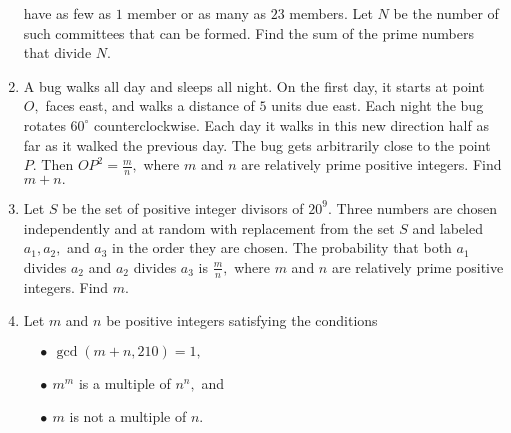 \documentclass{article}
\begin{document}
\begin{enumerate}[label=\arabic*., itemsep=0.5em]
have as few as \(1\) member or as many as \(23\) members. Let \(N\) be the number of such committees that can be formed. Find the sum of the prime numbers that divide \(N.\)\par \vspace{0.5em}\item A bug walks all day and sleeps all night. On the first day, it starts at point \(O,\) faces east, and walks a distance of \(5\) units due east. Each night the bug rotates \(60^\circ\) counterclockwise. Each day it walks in this new direction half as far as it walked the previous day. The bug gets arbitrarily close to the point \(P.\) Then \(OP^2=\tfrac{m}{n},\) where \(m\) and \(n\) are relatively prime positive integers. Find \(m+n.\)\par \vspace{0.5em}\item Let \(S\) be the set of positive integer divisors of \(20^9.\) Three numbers are chosen independently and at random with replacement from the set \(S\) and labeled \(a_1,a_2,\) and \(a_3\) in the order they are chosen. The probability that both \(a_1\) divides \(a_2\) and \(a_2\) divides \(a_3\) is \(\tfrac{m}{n},\) where \(m\) and \(n\) are relatively prime positive integers. Find \(m.\)\par \vspace{0.5em}\item Let \(m\) and \(n\) be positive integers satisfying the conditions

\(\quad\bullet\ \gcd(m+n,210)=1,\)

\(\quad\bullet\ m^m\) is a multiple of \(n^n,\) and

\(\quad\bullet\ m\) is not a multiple of \(n.\)


\end{enumerate}
\end{document}
